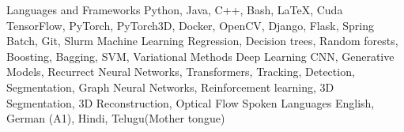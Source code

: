 \begin{cvskills}
    \cvskill
    {Languages and \linebreak Frameworks} %
    {Python, Java, C++, Bash, \LaTeX, Cuda \linebreak TensorFlow, PyTorch, PyTorch3D,
    Docker, OpenCV, Django, Flask, Spring Batch, Git, Slurm} %
    \cvskill
    {Machine Learning} %
    {Regression, Decision trees, Random forests, Boosting, Bagging, SVM,
    Variational Methods} %
    \cvskill
    {Deep Learning} %
    {CNN, Generative Models, Recurrect Neural Networks, Transformers, Tracking,
    Detection, Segmentation, \linebreak Graph Neural Networks, Reinforcement
    learning, 3D Segmentation, 3D Reconstruction, Optical Flow} %
    \cvskill
    {Spoken Languages} %
    {English, German (A1), Hindi, Telugu(Mother tongue)} %
\end{cvskills}
